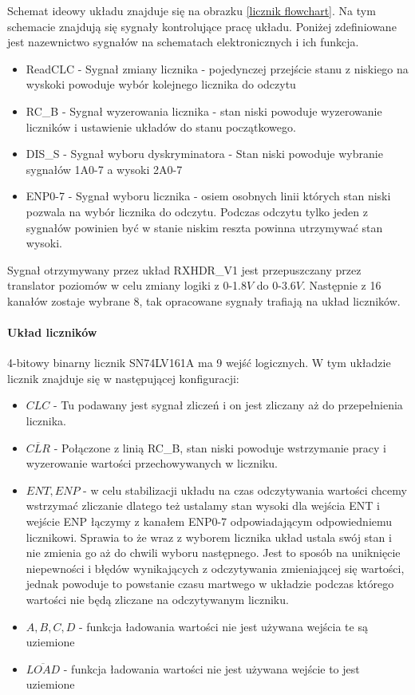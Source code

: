 Schemat ideowy układu znajduje się na obrazku \ref{licznik flowchart}.
Na tym schemacie znajdują się sygnały kontrolujące pracę układu. Poniżej zdefiniowane jest nazewnictwo sygnałów na schematach elektronicznych i ich funkcja.  
\begin{itemize}
        \item ReadCLC - Sygnał zmiany licznika - pojedynczej przejście stanu z niskiego na wyskoki powoduje wybór kolejnego licznika do odczytu
        \item RC\_B - Sygnał wyzerowania licznika - stan niski powoduje wyzerowanie liczników i ustawienie układów do stanu początkowego.
        \item DIS\_S - Sygnał wyboru dyskryminatora - Stan niski powoduje wybranie sygnałów 1A0-7 a wysoki 2A0-7
        \item ENP0-7 - Sygnał wyboru licznika - osiem osobnych linii których stan niski pozwala na wybór licznika do odczytu. Podczas odczytu tylko jeden z sygnałów powinien być w stanie niskim reszta powinna utrzymywać stan wysoki. 
\end{itemize}
Sygnał otrzymywany przez układ RXHDR\_V1 jest przepuszczany przez translator poziomów w celu zmiany logiki z 0-1.8$V$ do 0-3.6$V$. Następnie z 16 kanałów zostaje wybrane 8, tak opracowane sygnały trafiają na układ liczników.

\paragraph{Układ liczników \cite{licznik doc}\cite{slave}}

4-bitowy binarny licznik SN74LV161A ma 9 wejść logicznych. 
W tym układzie licznik znajduje się w następującej konfiguracji:
\begin{itemize}
        \item $CLC$ - Tu podawany jest sygnał zliczeń i on jest zliczany aż do przepełnienia licznika.
        \item $\overline{CLR}$ - Połączone z linią RC\_B, stan niski powoduje wstrzymanie pracy i wyzerowanie wartości przechowywanych w liczniku. 
        \item $ENT,ENP$ - w celu stabilizacji układu na czas odczytywania wartości chcemy wstrzymać zliczanie dlatego też ustalamy stan wysoki dla wejścia ENT i wejście ENP łączymy z kanałem ENP0-7 odpowiadającym odpowiedniemu licznikowi.
        Sprawia to że wraz z wyborem licznika układ ustala swój stan i nie zmienia go aż do chwili wyboru następnego. 
        Jest to sposób na uniknięcie niepewności i błędów wynikających z odczytywania zmieniającej się wartości, jednak powoduje to powstanie czasu martwego w układzie podczas którego wartości nie będą zliczane na odczytywanym liczniku.
        \item $A,B,C,D$ - funkcja ładowania wartości nie jest używana wejścia te są uziemione
        \item $\overline{LOAD}$ - funkcja ładowania wartości nie jest używana wejście to jest uziemione
\end{itemize} 

